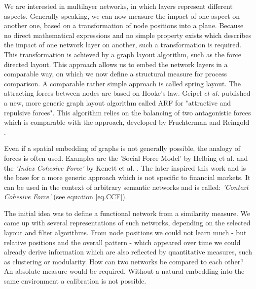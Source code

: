 \documentclass[a4paper,10pt]{scrbook}
\begin{document}
We are interested in multilayer networks, in which layers represent different aspects. Generally speaking, we can now measure the impact of one aspect on another one, based on a transformation of node positions into a plane. Because no direct mathematical expressions and no simple property exists which describes the impact of one network layer on another, such a transformation is required. This transformation is achieved by a graph layout algorithm, such as the force directed layout. This approach allows us to embed the network layers in a comparable way, on which we now define a structural measure for process comparison. A comparable rather simple approach is called spring layout. The attracting forces between nodes are based on Hooke's law. Geipel \textit{et al.} published a new, more generic graph layout algorithm called ARF for "attractive and repulsive forces". This algorithm relies on the balancing of two antagonistic forces which is comparable with the approach, developed by Fruchterman and Reingold \cite{Fruchterman1991}. 

Even if a spatial embedding of graphs is not generally possible, the analogy of forces is often used. Examples are the 'Social Force Model' by Helbing et al. and the \textit{'Index Cohesive Force'} by Kenett et al. \cite{Kenett2011}. The later inspired this work and is the base for a more generic approach which is not specific to financial markets. It can be used in the context of arbitrary semantic networks and is called: \textit{'Context Cohesive Force'} (see equation \ref{eq.CCF}). 

The initial idea was to define a functional network from a similarity measure. We came up with several representations of such networks, depending on the selected layout and filter algorithms. From node positions we could not learn much - but relative positions and the overall pattern - which appeared over time we could already derive information which are also reflected by quantitative measures, such as clustering or modularity. How can two networks be compared to each other? An absolute measure would be required. Without a natural embedding into the same environment a calibration is not possible. 
\end{document}
